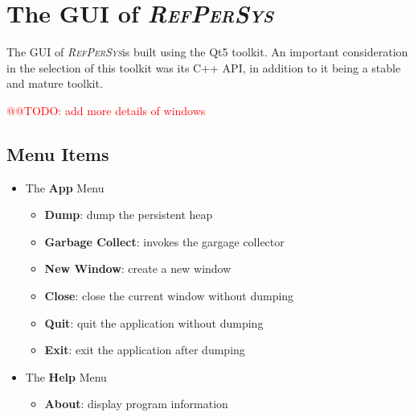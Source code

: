 \documentclass[11pt,a4paper,svgnames]{article}
\newcommand{\RefPerSys}{{\textit{\textsc{RefPerSys}}}}
\begin{document}
\section{The GUI of \RefPerSys}
\label{sec:gui}

The GUI of \RefPerSys is built using the Qt5 toolkit. An important consideration
in the selection of this toolkit was its C++ API, in addition to it being a stable
and mature toolkit.

\textcolor{red}{@@TODO: add more details of windows}

\subsection{Menu Items}
\label{subsec:gui-menu}

\begin{itemize}
  \item The \textbf{App} Menu
    \begin{itemize}
      \item \textbf{Dump}: dump the persistent heap
      \item \textbf{Garbage Collect}: invokes the gargage collector
      \item \textbf{New Window}: create a new window
      \item \textbf{Close}: close the current window without dumping
      \item \textbf{Quit}: quit the application without dumping
      \item \textbf{Exit}: exit the application after dumping
    \end{itemize}
  \item The \textbf{Help} Menu
    \begin{itemize}
      \item \textbf{About}: display program information
    \end{itemize}
\end{itemize}

\clearpage
\printnoidxglossaries
\bigskip
\printbibliography
\bigskip
\printindex
\end{document}
